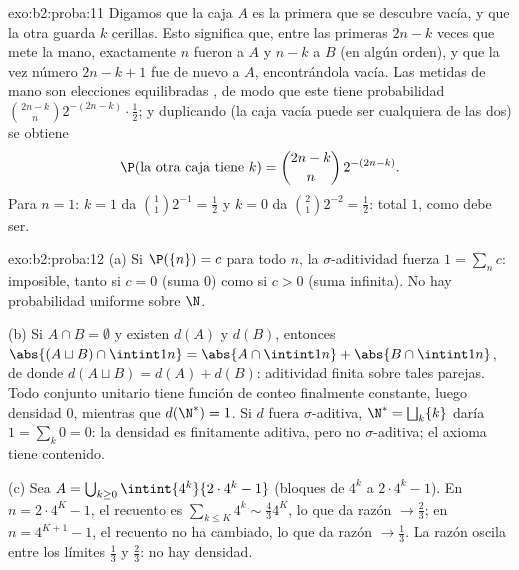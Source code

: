 \begin{solution}{exo:b2:proba:11}
Digamos que la caja $A$ es la primera que se descubre vacía, y que la
otra guarda $k$ cerillas. Esto significa que, entre las primeras $2n
- k$ veces que mete la mano, exactamente $n$ fueron a $A$ y $n - k$ a
$B$ (en algún orden), y que la vez número $2n - k + 1$ fue de nuevo a
$A$, encontrándola vacía. Las metidas de mano son elecciones
equilibradas , de modo que este  tiene
probabilidad $\binom{2n-k}{n}2^{-(2n-k)}\cdot\frac12$; y duplicando
(la caja vacía puede ser cualquiera de las dos) se obtiene
\[
\P(\text{la otra caja tiene }k) = \binom{2n-k}{n}\,2^{-(2n-k)} .
\]
Para $n = 1$: $k = 1$ da $\binom11 2^{-1} = \frac12$ y $k = 0$ da
$\binom21 2^{-2} = \frac12$: total $1$, como debe ser.
\end{solution}

\begin{solution}{exo:b2:proba:12}
(a) Si $\P(\{n\}) = c$ para todo $n$, la $\sigma$-aditividad fuerza
$1 = \sum_nc$: imposible, tanto si $c = 0$ (suma $0$) como si $c > 0$
(suma infinita). No hay probabilidad uniforme sobre $\N$.

(b) Si $A \cap B = \emptyset$ y existen $d(A)$ y $d(B)$, entonces
$\abs{(A \sqcup B)\cap\intint1n} = \abs{A\cap\intint1n} +
\abs{B\cap\intint1n}$, de donde $d(A \sqcup B) = d(A) + d(B)$:
aditividad finita sobre tales parejas. Todo conjunto unitario tiene
función de conteo finalmente constante, luego densidad $0$, mientras
que $d(\N^*) = 1$. Si $d$ fuera $\sigma$-aditiva, $\N^* =
\bigsqcup_k\{k\}$ daría $1 = \sum_k 0 = 0$: la densidad es
finitamente aditiva, pero no $\sigma$-aditiva; el axioma tiene
contenido.

(c) Sea $A = \bigcup_{k\geq0}\intint{4^k}{2\cdot4^k - 1}$ (bloques de
$4^k$ a $2\cdot4^k - 1$). En $n = 2\cdot4^K - 1$, el recuento es
$\sum_{k\leq K}4^k \sim \frac43 4^K$, lo que da razón $\to \frac23$;
en $n = 4^{K+1} - 1$, el recuento no ha cambiado, lo que da razón
$\to \frac13$. La razón oscila entre los límites $\frac13$ y
$\frac23$: no hay densidad.
\end{solution}

